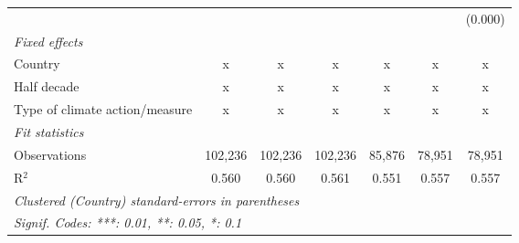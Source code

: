 \begin{tabular}{lcccccc}
                                                      &         &               &              &              &              & (0.000)\\   
   \emph{Fixed effects}\\
   Country                                            & x       & x             & x            & x            & x            & x\\  
   Half decade                                        & x       & x             & x            & x            & x            & x\\  
   Type of climate action/measure                     & x       & x             & x            & x            & x            & x\\  
   \midrule \emph{Fit statistics}\\
   Observations                                       & 102,236 & 102,236       & 102,236      & 85,876       & 78,951       & 78,951\\  
   R$^2$                                              & 0.560   & 0.560         & 0.561        & 0.551        & 0.557        & 0.557\\  
   \midrule
   \multicolumn{7}{l}{\emph{Clustered (Country) standard-errors in parentheses}}\\
   \multicolumn{7}{l}{\emph{Signif. Codes: ***: 0.01, **: 0.05, *: 0.1}}\\
\end{tabular}
\par\endgroup


